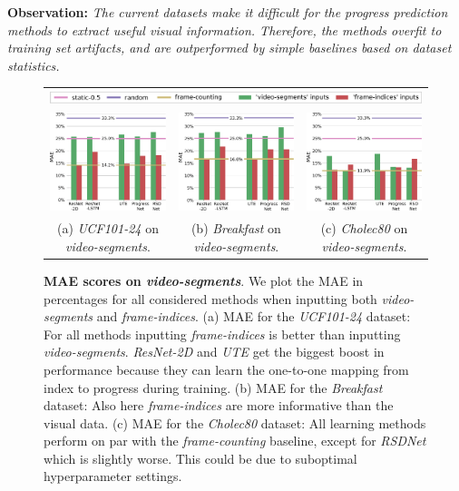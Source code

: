 \smallskip\noindent\textbf{Observation:} 
\emph{
The current datasets make it difficult for the progress prediction methods to extract useful visual information.
Therefore, the methods overfit to training set artifacts, and are outperformed by simple baselines based on dataset statistics.}

\begin{figure}
\centering
    \begin{tabular}{ccc}
    \multicolumn{3}{c}{\includegraphics[width=.8\linewidth]{media/results/legend_seg2.pdf}} \\
    \includegraphics[width=0.31\linewidth]{media/results/ucf_seg.pdf} & 
    \includegraphics[width=0.31\linewidth]{media/results/breakfast_seg.pdf} &
    \includegraphics[width=0.31\linewidth]{media/results/cholec_seg.pdf} \\
    {\small (a) \textsl{UCF101-24} on \textsl{video-segments}.} &
    {\small (b) \textsl{Breakfast} on \textsl{video-segments}.} &
    {\small (c) \textsl{Cholec80} on \textsl{video-segments}.} \\
    \end{tabular}
   \caption{\textbf{MAE scores on \textsl{video-segments}}. 
       We plot the MAE in percentages for all considered methods when inputting both \textsl{video-segments} and \textsl{frame-indices}. 
       (a) MAE for the \textsl{UCF101-24} dataset: For all methods inputting \textsl{frame-indices} is better than inputting \textsl{video-segments}. 
        \textsl{ResNet-2D} and \textsl{UTE} get the biggest boost in performance because they can learn the one-to-one mapping from index to progress during training. 
       (b) MAE for the \textsl{Breakfast} dataset: Also here \textsl{frame-indices} are more informative than the visual data.
       (c) MAE for the \textsl{Cholec80} dataset: All learning methods perform on par with the \textsl{frame-counting} baseline, except for \textsl{RSDNet} which is slightly worse. 
        This could be due to suboptimal hyperparameter settings. 
   }
\label{fig:seg}
\end{figure}
